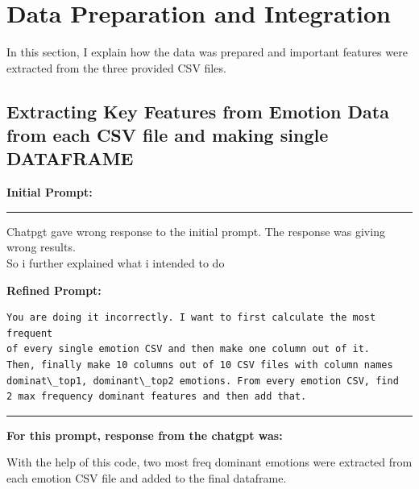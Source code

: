 \documentclass[11pt,a4paper]{article}
\begin{document}
\newpage
\section{Data Preparation and Integration}
\label{sec:data-prep}

In this section, I explain how the data was prepared and important features were extracted from the three provided CSV files.

\subsection{Extracting Key Features from Emotion Data from each CSV file and making single DATAFRAME}
\textbf{Initial Prompt:}
\begin{tcolorbox}[breakable, colback=gray!5, colframe=gray!50!black,title= Prompt]

\end{tcolorbox}
\begin{center}
    \color{red}\rule{1\linewidth}{0.5mm}
\end{center}


\begin{responsebox}
    Chatpgt gave wrong response to the initial prompt. The response was giving wrong results.\\
    So i further explained what i intended to do
\end{responsebox}
   



\textbf{Refined Prompt:}
\begin{verbatim}
You are doing it incorrectly. I want to first calculate the most frequent 
of every single emotion CSV and then make one column out of it. 
Then, finally make 10 columns out of 10 CSV files with column names 
dominat\_top1, dominant\_top2 emotions. From every emotion CSV, find 
2 max frequency dominant features and then add that.
\end{verbatim}
\begin{center}
    \color{red}\rule{1\linewidth}{0.5mm}
\end{center}


\textbf{For this prompt, response from the chatgpt was:}
\begin{tcolorbox}[breakable, colback=gray!5, colframe=gray!50!black]

\end{tcolorbox}

\large{With the help of this code, two most freq dominant emotions were extracted from each emotion CSV file and added to the final dataframe.\\}
\end{document}
